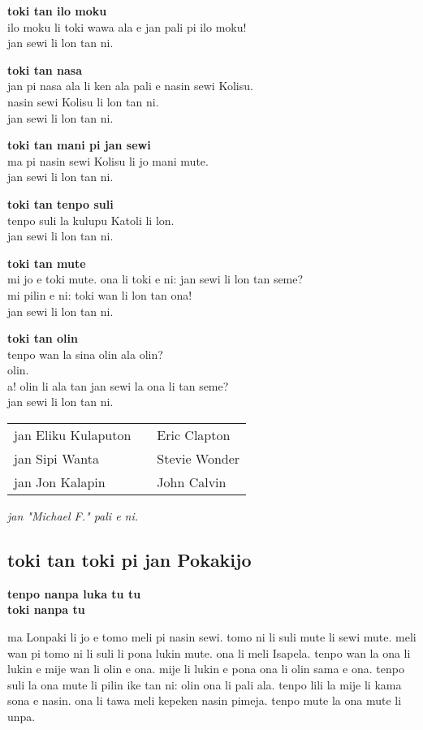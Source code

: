 \textbf{toki tan ilo moku}   \\
ilo moku li toki wawa ala e jan pali pi ilo moku!   \\
jan sewi li lon tan ni.

\textbf{toki tan nasa}   \\
jan pi nasa ala li ken ala pali e nasin sewi Kolisu.   \\
nasin sewi Kolisu li lon tan ni.   \\
jan sewi li lon tan ni.

\textbf{toki tan mani pi jan sewi}   \\
ma pi nasin sewi Kolisu li jo mani mute.   \\
jan sewi li lon tan ni.

\textbf{toki tan tenpo suli}   \\
tenpo suli la kulupu Katoli li lon.   \\
jan sewi li lon tan ni.

\textbf{toki tan mute}   \\
mi jo e toki mute. ona li toki e ni: jan sewi li lon tan seme?   \\
mi pilin e ni: toki wan li lon tan ona!   \\
jan sewi li lon tan ni.

\textbf{toki tan olin}   \\
tenpo wan la sina olin ala olin?   \\
olin.   \\
a! olin li ala tan jan sewi la ona li tan seme?   \\
jan sewi li lon tan ni.

\begin{supertabular}{p{5,5cm}|ll}
    jan Eliku Kulaputon &  & Eric Clapton  \\
    jan Sipi Wanta      &  & Stevie Wonder \\
    jan Jon Kalapin     &  & John Calvin   \\
\end{supertabular}

\textit{jan "Michael F." pali e ni. \cite{www:failbluedot:01}}

\newpage
\subsection{toki tan toki pi jan Pokakijo}
\textbf{tenpo nanpa luka tu tu \\
    toki nanpa tu}

ma Lonpaki li jo e tomo meli pi nasin sewi.
tomo ni li suli mute li sewi mute.
meli wan pi tomo ni li suli li pona lukin mute.
ona li meli Isapela.
tenpo wan la ona li lukin e mije wan li olin e ona.
mije li lukin e pona ona li olin sama e ona.
tenpo suli la ona mute li pilin ike tan ni: olin ona li pali ala.
tenpo lili la mije li kama sona e nasin.
ona li tawa meli kepeken nasin pimeja.
tenpo mute la ona mute li unpa.

